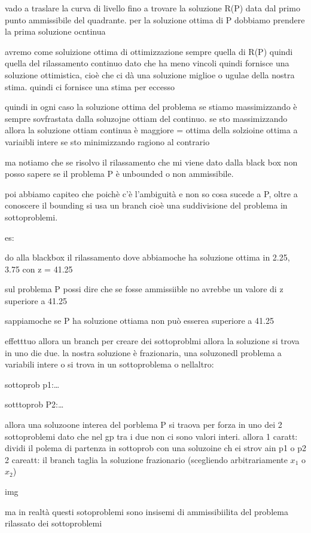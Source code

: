 vado a traslare la curva di livello fino a trovare la soluzione R(P) data dal primo punto ammissibile del quadrante. per la soluzione ottima di P dobbiamo prendere la prima soluzione ocntinua


avremo come soluizione ottima di ottimizzazione sempre quella di R(P) quindi quella del rilassamento continuo dato che ha meno vincoli quindi fornisce una soluzione ottimistica, cioè che ci dà una soluzione miglioe o ugulae della nostra stima. quindi ci fornisce una stima per eccesso


quindi in ogni caso la soluzione ottima del problema se stiamo massimizzando è sempre sovfrastata dalla soluzojne ottiam del continuo. se sto massimizzando allora la soluzione ottiam continua è maggiore = ottima della solzioine ottima a variaibli intere se sto minimizzando ragiono al contrario



ma notiamo che se risolvo il rilassamento che mi viene dato dalla black box non posso sapere se il problema P è unbounded o non ammissibile.

poi abbiamo capiteo che poichè c'è l'ambiguità e non so cosa sucede a P, oltre a conoscere il bounding si usa un branch cioè una suddivisione del problema in sottoproblemi. 

es: 

do alla blackbox il rilassamento dove abbiamoche ha soluzione ottima in 2.25, 3.75 con z = 41.25

sul problema P possi dire che se fosse ammissiible no avrebbe un valore di z superiore a 41.25 

sappiamoche se P ha soluzione ottiama non può esserea superiore a 41.25


effetttuo allora un branch per creare dei sottoproblmi allora la soluzione si trova in uno die due. la nostra soluzione è frazionaria, una soluzonedl problema a variabili intere o si trova in un sottoproblema o nellaltro:

sottoprob p1:\dots

sotttoprob P2:\dots


allora una soluzoone interea del porblema P si traova per forza in uno dei 2 sottoproblemi dato che nel gp tra i due non ci sono valori interi. allora
1 caratt: dividi il polema di partenza in sottoprob con una soluzoine ch ei strov ain p1 o p2 
2 careatt: il branch taglia la soluzione frazionario (scegliendo arbitrariamente $x_1$ o $x_2$)

img

ma in realtà questi sotoproblemi sono insisemi di ammissibiilita del problema rilassato dei sottoproblemi


